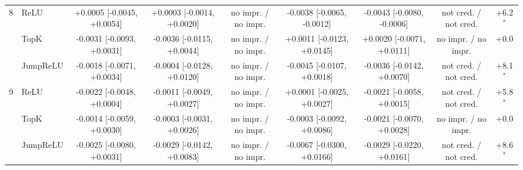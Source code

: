 \begin{table}[t]
\begin{adjustbox}{max width=\linewidth}
\begin{tabular}{llccccccc}
\midrule
8 & ReLU & +0.0005 [-0.0045, +0.0054] & +0.0003 [-0.0014, +0.0020] & no impr. / no impr. & -0.0038 [-0.0065, -0.0012] & -0.0043 [-0.0080, -0.0006] & not cred. / not cred. & +6.2$^\ast$ \\
 & TopK & -0.0031 [-0.0093, +0.0031] & -0.0036 [-0.0115, +0.0044] & no impr. / no impr. & +0.0011 [-0.0123, +0.0145] & +0.0020 [-0.0071, +0.0111] & no impr. / no impr. & +0.0 \\
 & JumpReLU & -0.0018 [-0.0071, +0.0034] & -0.0004 [-0.0128, +0.0120] & no impr. / no impr. & -0.0045 [-0.0107, +0.0018] & -0.0036 [-0.0142, +0.0070] & not cred. / not cred. & +8.1$^\ast$ \\
\midrule
9 & ReLU & -0.0022 [-0.0048, +0.0004] & -0.0011 [-0.0049, +0.0027] & no impr. / no impr. & +0.0001 [-0.0025, +0.0027] & -0.0021 [-0.0058, +0.0015] & not cred. / not cred. & +5.8$^\ast$ \\
 & TopK & -0.0014 [-0.0059, +0.0030] & -0.0003 [-0.0031, +0.0026] & no impr. / no impr. & -0.0003 [-0.0092, +0.0086] & -0.0021 [-0.0070, +0.0028] & no impr. / no impr. & +0.0 \\
 & JumpReLU & -0.0025 [-0.0080, +0.0031] & -0.0029 [-0.0142, +0.0083] & no impr. / no impr. & -0.0067 [-0.0300, +0.0166] & -0.0029 [-0.0220, +0.0161] & not cred. / not cred. & +8.6$^\ast$ \\
\bottomrule
\end{tabular}
\end{adjustbox}
\end{table}
